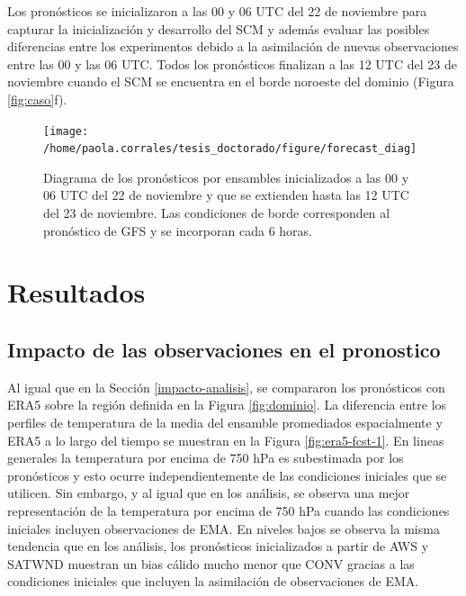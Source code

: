 \documentclass[12pt,oneside,a4paper]{reedthesis}
\begin{document}
Los pronósticos se inicializaron a las 00 y 06 UTC del 22 de noviembre para capturar la inicialización y desarrollo del SCM y además evaluar las posibles diferencias entre los experimentos debido a la asimilación de nuevas observaciones entre las 00 y las 06 UTC. Todos los pronósticos finalizan a las 12 UTC del 23 de noviembre cuando el SCM se encuentra en el borde noroeste del dominio (Figura \ref{fig:caso}f).


\begin{figure}
\texttt{[image: /home/paola.corrales/tesis\_doctorado/figure/forecast\_diag]} \caption{Diagrama de los pronósticos por ensambles inicializados a las 00 y 06 UTC del 22 de noviembre y que se extienden hasta las 12 UTC del 23 de noviembre. Las condiciones de borde corresponden al pronóstico de GFS y se incorporan cada 6 horas.}\label{fig:cycle-fcst}
\end{figure}
\hypertarget{resultados-1}{%
\section{Resultados}\label{resultados-1}}

\hypertarget{prono-impacto}{%
\subsection{Impacto de las observaciones en el pronostico}\label{prono-impacto}}

Al igual que en la Sección \ref{impacto-analisis}, se compararon los pronósticos con ERA5 sobre la región definida en la Figura \ref{fig:dominio}. La diferencia entre los perfiles de temperatura de la media del ensamble promediados espacialmente y ERA5 a lo largo del tiempo se muestran en la Figura \ref{fig:era5-fcst-1}. En lineas generales la temperatura por encima de 750 hPa es subestimada por los pronósticos y esto ocurre independientemente de las condiciones iniciales que se utilicen. Sin embargo, y al igual que en los análisis, se observa una mejor representación de la temperatura por encima de 750 hPa cuando las condiciones iniciales incluyen observaciones de EMA. En niveles bajos se observa la misma tendencia que en los análisis, los pronósticos inicializados a partir de AWS y SATWND muestran un bias cálido mucho menor que CONV gracias a las condiciones iniciales que incluyen la asimilación de observaciones de EMA.
\end{document}
